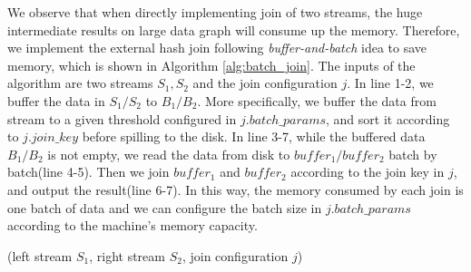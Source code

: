  We observe that when directly implementing join of two streams, the huge intermediate results on large data graph will consume up the memory. Therefore, we implement the external hash join following \textit{buffer-and-batch} idea to save memory, which is shown in Algorithm \ref{alg:batch_join}. The inputs of the algorithm are two streams $S_1, S_2$ and the join configuration $j$. In line 1-2, we buffer the data in $S_1/S_2$ to $B_1/B_2$. More specifically, we buffer the data from stream to a given threshold configured in $j.batch\_params$, and sort it according to $j.join\_key$ before spilling to the disk. In line 3-7, while the buffered data $B_1/B_2$ is not empty, we read the data from disk to $buffer_1/buffer_2$ batch by batch(line 4-5). Then we join $buffer_1$ and $buffer_2$ according to the join key in $j$, and output the result(line 6-7). In this way, the memory consumed by each join is one batch of data and we can configure the batch size in $j.batch\_params$ according to the machine's memory capacity. 


\begin{algorithm}[htb]
\SetAlgoVlined
{}
\small
\caption{(left stream $S_1$, right stream $S_2$, join configuration $j$)}
\label{alg:batch_join}
\\
\\
\end{algorithm}